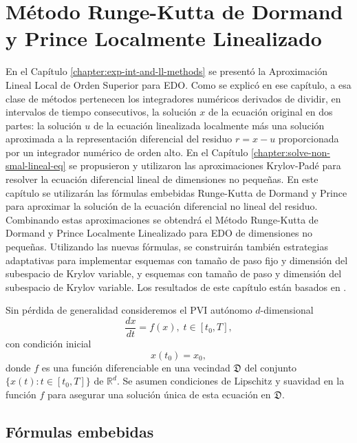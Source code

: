 \chapter{Método Runge-Kutta de Dormand y Prince Localmente Linealizado}\label{chapter:lldp}

En el Capítulo \ref{chapter:exp-int-and-ll-methods} se presentó la Aproximación Lineal Local de Orden Superior para EDO. Como se explicó en ese capítulo, a esa clase de métodos pertenecen los integradores numéricos derivados de dividir, en intervalos de tiempo consecutivos, la solución $x$ de la ecuación original en dos partes: la solución $u$ de la ecuación linealizada localmente más una solución aproximada a la representación diferencial del residuo $r=x-u$ proporcionada por un integrador numérico de orden alto. En el Capítulo \ref{chapter:solve-non-smal-lineal-eq} se propusieron y utilizaron las aproximaciones Krylov-Padé para resolver la ecuación diferencial lineal de dimensiones no pequeñas. En este capítulo se utilizarán las fórmulas embebidas Runge-Kutta de Dormand y Prince para aproximar la solución de la ecuación diferencial no lineal del residuo. Combinando estas aproximaciones se obtendrá el Método Runge-Kutta de Dormand y Prince Localmente Linealizado para EDO de dimensiones no pequeñas. Utilizando las nuevas fórmulas, se construirán también estrategias adaptativas para implementar esquemas con tamaño de paso fijo y dimensión del subespacio de Krylov variable, y esquemas con tamaño de paso y dimensión del subespacio de Krylov variable. Los resultados de este capítulo están basados en \cite{naranjo2021locally}.

Sin pérdida de generalidad consideremos el PVI autónomo $d$-dimensional
\begin{equation}\label{syst}
\frac{dx}{dt}=f(x), \; t\in[t_0,T],\end{equation}
con condición inicial
\begin{equation}\label{systcond}
x(t_0)=x_0,
\end{equation}donde $f$ es una función diferenciable en una vecindad
$\mathfrak{D}$ del conjunto $\{x(t):t\in [t_0,T]\}$ de $\mathbb{R}^{d}$. Se asumen condiciones de Lipschitz y suavidad en la función $f$ para asegurar una solución única de esta ecuación en $\mathfrak{D}$.

\section{Fórmulas embebidas}

